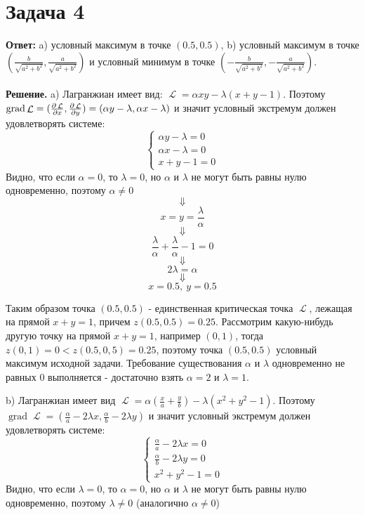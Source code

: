 \documentclass{article}
\DeclareMathOperator{\grad}{grad}
\DeclareMathOperator{\lagr}{\mathcal{L}}
\begin{document}
\section*{Задача 4}
{\bf Ответ: } a) условный максимум в точке $(0.5, 0.5)$, b) условный максимум в точке $(\frac{b}{\sqrt{a^2+b^2}}, \frac{a}{\sqrt{a^2+b^2}})$ и условный минимум в точке $(-\frac{b}{\sqrt{a^2+b^2}}, -\frac{a}{\sqrt{a^2+b^2}})$.
\\
\\
{\bf Решение.} a) Лагранжиан имеет вид: $\lagr = \alpha xy - \lambda (x+y-1)$. Поэтому $\grad \lagr=(\pdv{\lagr}{x}, \pdv{\lagr}{y})=(\alpha y - \lambda, \alpha x - \lambda)$ и значит условный экстремум должен удовлетворять системе:
\begin{equation*}
 \begin{cases}
   \alpha y - \lambda=0\\
   \alpha x - \lambda=0\\
   x+y-1=0
 \end{cases}
\end{equation*}
Видно, что если $\alpha=0$, то $\lambda=0$, но $\alpha$ и $\lambda$ не могут быть равны нулю одновременно, поэтому $\alpha \neq 0$
$$\Downarrow$$
$$x=y=\frac{\lambda}{\alpha}$$
$$\Downarrow$$
$$\frac{\lambda}{\alpha}+\frac{\lambda}{\alpha}-1=0$$
$$\Downarrow$$
$$2\lambda=\alpha$$
$$\Downarrow$$
$$x=0.5,\ y=0.5$$
\par
Таким образом точка $(0.5, 0.5)$ - единственная критическая точка $\lagr$, лежащая на прямой $x+y=1$, причем $z(0.5, 0.5)=0.25$. Рассмотрим какую-нибудь другую точку на прямой $x+y=1$, например $(0,1)$, тогда $z(0,1)=0 < z(0.5,0,5)=0.25$, поэтому точка $(0.5,0.5)$ условный максимум исходной задачи. Требование существования $\alpha$ и $\lambda$ одновременно не равных 0 выполняется - достаточно взять $\alpha = 2$ и $\lambda = 1$.
\par
b) Лагранжиан имеет вид $\lagr = \alpha(\frac{x}{a}+\frac{y}{b})-\lambda(x^2+y^2-1)$. Поэтому $\grad \lagr=(\frac{\alpha}{a}-2\lambda x, \frac{\alpha}{b}-2\lambda y)$ и значит условный экстремум должен удовлетворять системе:
\begin{equation*}
 \begin{cases}
   \frac{\alpha}{a}-2\lambda x =0\\
   \frac{\alpha}{b}-2\lambda y =0\\
   x^2+y^2-1=0
 \end{cases}
\end{equation*}
Видно, что если $\lambda=0$, то $\alpha=0$, но $\alpha$ и $\lambda$ не могут быть равны нулю одновременно, поэтому $\lambda \neq 0$ (аналогично $\alpha \neq 0$)
\end{document}
